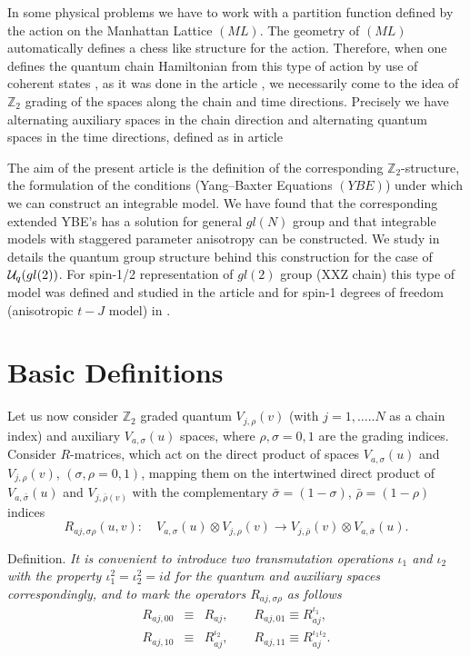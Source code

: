 \documentclass[a4paper,a4paper]{article}
\def\ZZ{{\mathbb Z}}
\newcommand{\si}{\sigma}
\newcommand{\nn}{\nonumber}
\begin{document}
\indent

In some physical problems \cite{S1,CC} we have to work with a 
partition function defined by the action on the Manhattan Lattice
$(ML)$. The geometry of $(ML)$ automatically defines a chess like 
structure for the action. Therefore, when one defines the 
quantum chain Hamiltonian from this type of action by use of coherent
states \cite{F}, as it was done in the article \cite{S1}, we 
necessarily come to the idea of $\ZZ_2$ grading of the spaces
along the chain and time directions. Precisely we have 
alternating auxiliary spaces in the chain direction  and 
alternating quantum spaces
in the time directions, defined as in article \cite{APSS}

The aim of the present article is the definition of the
corresponding $\ZZ_2$-structure, the formulation of the conditions
(Yang--Baxter Equations $(YBE)$) under which we can construct
an integrable model. We have found that the corresponding 
extended 
YBE's has a solution
for general $gl(N)$ group and that integrable models
with  staggered parameter anisotropy can be constructed.
We study in details the quantum group structure
behind this construction for the case of ${\cal U}_q(gl(2))$. 
For spin-1/2 representation of $gl(2)$ group (XXZ chain)
this type of model 
was defined and studied in the article \cite{APSS} and for
spin-1 degrees of freedom (anisotropic $t-J$
model) in \cite{ASSS}.

\section{Basic Definitions}
\setcounter{equation}{0}

\indent

Let us now consider $\ZZ_2$ graded quantum $V_{j,\rho}(v)$ 
(with $j=1,.....N$ as a chain index) and 
auxiliary $V_{a,\si}(u)$ spaces, where $\rho, \si =0,1$ are
the grading indices. Consider
$R$-matrices, which act on the direct product
of  spaces $V_{a,\si}(u)$ and $ V_{j,\rho}(v)$, $(\si,\rho =0,1)$,
mapping them on the intertwined direct product of 
$V_{a,\bar{\si}}(u)$ and $ V_{j,\bar{\rho}(v)}$ with the complementary
$\bar{\si}=(1-\si)$, $\bar{\rho}=(1-\rho)$ indices
\begin{equation}
\label{R1}
R_{aj,\si \rho}\left( u,v\right):\quad V_{a,\si}(u)\otimes 
V_{j,\rho}(v)\rightarrow V_{j,\bar{\rho}}(v)\otimes V_{a,\bar{\si}}(u).  
\end{equation}
\medskip

\noindent
{\large \sc Definition.} 
\textsl{It is convenient to introduce 
two transmutation operations $\iota_1$
and $\iota_2$ with the property $\iota_1^2=\iota_2^2=id$ 
for the quantum and auxiliary spaces
correspondingly, and to mark the operators $R_{aj,\si\rho}$ as 
follows
\begin{eqnarray}
\label{R2}
R_{aj,00}&\equiv& R_{aj},\qquad R_{aj,01}\equiv R_{aj}^{\iota_1},\nn\\
R_{aj,10}&\equiv& R_{aj}^{\iota_2},\qquad R_{aj,11}\equiv R_{aj}^{\iota_1 
\iota_2}.
\end{eqnarray}
}
\end{document}
